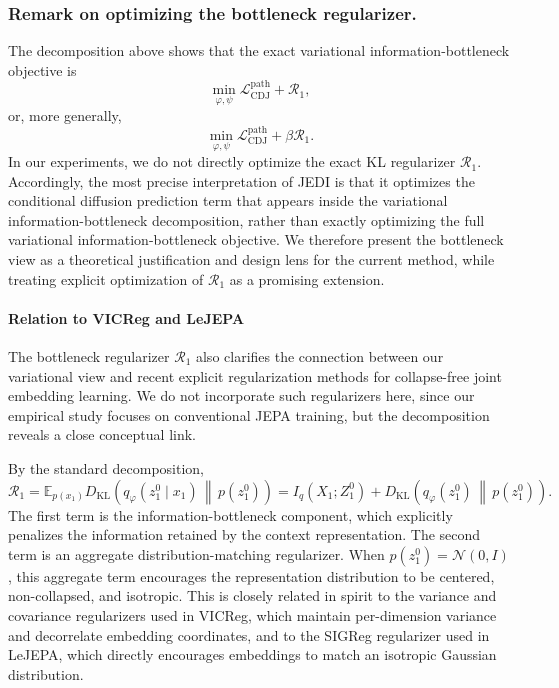 \documentclass{article}
\newcommand{\E}{\mathbb{E}}
\newcommand{\KL}{D_{\mathrm{KL}}}
\begin{document}
\subsubsection{Remark on optimizing the bottleneck regularizer.}
\label{app:optimizing-the-bottlenck-regularizer}
The decomposition above shows that the exact variational information-bottleneck
objective is
\begin{equation}
\min_{\varphi,\psi}
\mathcal L_{\mathrm{CDJ}}^{\mathrm{path}}
+
\mathcal R_1,
\end{equation}
or, more generally,
\begin{equation}
\min_{\varphi,\psi}
\mathcal L_{\mathrm{CDJ}}^{\mathrm{path}}
+
\beta \mathcal R_1.
\end{equation}
In our experiments, we do not directly optimize the exact KL regularizer
$\mathcal R_1$. Accordingly, the most precise interpretation of JEDI is that it
optimizes the conditional diffusion prediction term that appears inside the
variational information-bottleneck decomposition, rather than exactly
optimizing the full variational information-bottleneck objective. We therefore
present the bottleneck view as a theoretical justification and design lens for
the current method, while treating explicit optimization of $\mathcal R_1$ as a
promising extension.

\paragraph{Relation to VICReg and LeJEPA \citep{balestriero2025lejepa, shwartz2023informationVICREG}}
\label{app:relation-vicereg-lejepa}
The bottleneck regularizer $\mathcal R_1$ also clarifies the connection between
our variational view and recent explicit regularization methods for
collapse-free joint embedding learning. We do not incorporate such
regularizers here, since our empirical study focuses on conventional JEPA
training, but the decomposition reveals a close conceptual link.

By the standard decomposition,
\begin{equation}
\mathcal R_1
=
\E_{p(x_1)}
\KL\left(
q_\varphi(z_1^0\mid x_1)
\,\middle\|\,
p(z_1^0)
\right)
=
I_q(X_1;Z_1^0)
+
\KL\left(
q_\varphi(z_1^0)
\,\middle\|\,
p(z_1^0)
\right).
\end{equation}
The first term is the information-bottleneck component, which explicitly
penalizes the information retained by the context representation. The second
term is an aggregate distribution-matching regularizer. When
$p(z_1^0)=\mathcal N(0,I)$, this aggregate term encourages the representation
distribution to be centered, non-collapsed, and isotropic. This is closely
related in spirit to the variance and covariance regularizers used in VICReg,
which maintain per-dimension variance and decorrelate embedding coordinates, and
to the SIGReg regularizer used in LeJEPA, which directly encourages embeddings
to match an isotropic Gaussian distribution.
\end{document}
